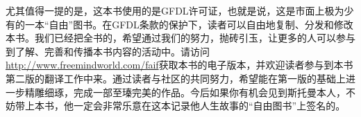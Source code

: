 尤其值得一提的是，这本书使用的是GFDL许可证，也就是说，这是市面上极为少有的一本``自由''图书。在GFDL条款的保护下，读者可以自由地复制、分发和修改本书。我们已经把全书的，希望通过我们的努力，抛砖引玉，让更多的人可以参与到了解、完善和传播本书内容的活动中。请访问\url{http://www.freemindworld.com/faif}获取本书的电子版本，并欢迎读者参与到本书第二版的翻译工作中来。通过读者与社区的共同努力，希望能在第一版的基础上进一步精雕细琢，完成一部至瑧完美的作品。今后如果你有机会见到斯托曼本人，不妨带上本书，他一定会非常乐意在这本记录他人生故事的``自由图书''上签名的。

\bigskip







